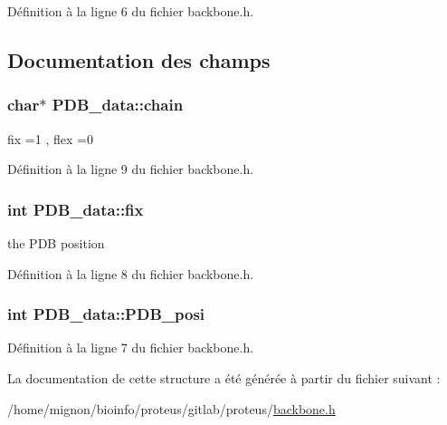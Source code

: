 Définition à la ligne 6 du fichier backbone.\+h.



\subsection{Documentation des champs}
\hypertarget{struct_p_d_b__data_a5537d000cfa82823ec82990183c041a7}{
\subsubsection[{chain}]{\setlength{\rightskip}{0pt plus 5cm}char$\ast$ P\+D\+B\+\_\+data\+::chain}}\label{struct_p_d_b__data_a5537d000cfa82823ec82990183c041a7}


fix =1 , flex =0 



Définition à la ligne 9 du fichier backbone.\+h.

\hypertarget{struct_p_d_b__data_ad3e7d8ee58824f6b448a65804ad8880d}{
\subsubsection[{fix}]{\setlength{\rightskip}{0pt plus 5cm}int P\+D\+B\+\_\+data\+::fix}}\label{struct_p_d_b__data_ad3e7d8ee58824f6b448a65804ad8880d}


the P\+D\+B position 



Définition à la ligne 8 du fichier backbone.\+h.

\hypertarget{struct_p_d_b__data_adc17445e0eb5d3c7e4834c530b0fb297}{
\subsubsection[{P\+D\+B\+\_\+posi}]{\setlength{\rightskip}{0pt plus 5cm}int P\+D\+B\+\_\+data\+::\+P\+D\+B\+\_\+posi}}\label{struct_p_d_b__data_adc17445e0eb5d3c7e4834c530b0fb297}


Définition à la ligne 7 du fichier backbone.\+h.



La documentation de cette structure a été générée à partir du fichier suivant \+:\begin{DoxyCompactItemize}
\item 
/home/mignon/bioinfo/proteus/gitlab/proteus/\hyperlink{backbone_8h}{backbone.\+h}\end{DoxyCompactItemize}
